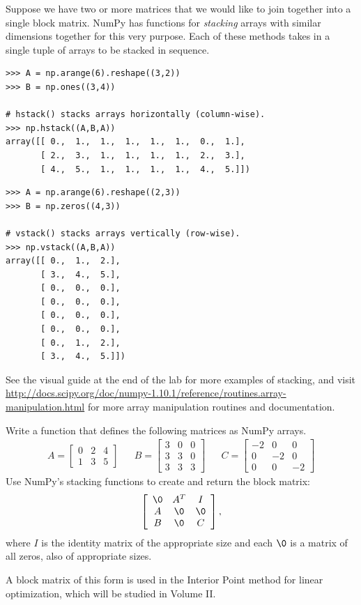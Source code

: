 Suppose we have two or more matrices that we would like to join together into a single block matrix.
NumPy has functions for \emph{stacking} arrays with similar dimensions together for this very purpose.
Each of these methods takes in a single tuple of arrays to be stacked in sequence.

\begin{lstlisting}
>>> A = np.arange(6).reshape((3,2))
>>> B = np.ones((3,4))

# hstack() stacks arrays horizontally (column-wise).
>>> np.hstack((A,B,A))
array([[ 0.,  1.,  1.,  1.,  1.,  1.,  0.,  1.],
       [ 2.,  3.,  1.,  1.,  1.,  1.,  2.,  3.],
       [ 4.,  5.,  1.,  1.,  1.,  1.,  4.,  5.]])
\end{lstlisting}

\begin{lstlisting}
>>> A = np.arange(6).reshape((2,3))
>>> B = np.zeros((4,3))

# vstack() stacks arrays vertically (row-wise).
>>> np.vstack((A,B,A))
array([[ 0.,  1.,  2.],
       [ 3.,  4.,  5.],
       [ 0.,  0.,  0.],
       [ 0.,  0.,  0.],
       [ 0.,  0.,  0.],
       [ 0.,  0.,  0.],
       [ 0.,  1.,  2.],
       [ 3.,  4.,  5.]])
\end{lstlisting}

See the visual guide at the end of the lab for more examples of stacking, and
visit \url{http://docs.scipy.org/doc/numpy-1.10.1/reference/routines.array-manipulation.html} for more array manipulation routines and documentation.

\begin{problem} %
Write a function that defines the following matrices as NumPy arrays.
\begin{align*}
A = \left[\begin{array}{rrr}
0 & 2 & 4\\
1 & 3 & 5\end{array}\right]
&&
B = \left[\begin{array}{rrr}
3 & 0 & 0\\
3 & 3 & 0\\
3 & 3 & 3\end{array}\right]
&&
C = \left[\begin{array}{rrr}
-2 & 0 & 0\\
0 & -2 & 0\\
0 & 0 & -2\end{array}\right]
\end{align*}
Use NumPy's stacking functions to create and return the block matrix:
\begin{align*}
\left[\begin{array}{ccc}
\0 & A^T & I\\
A & \0 & \0 \\
B & \0 & C \end{array}\right],
\end{align*}
where $I$ is the identity matrix of the appropriate size and each $\0$ is a matrix of all zeros, also of appropriate sizes.

A block matrix of this form is used in the Interior Point method for linear optimization, which will be studied in Volume II.
\label{prob:simple3}
\end{problem}

